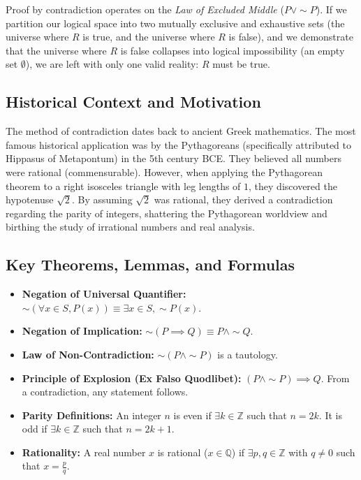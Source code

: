 \documentclass[11pt, letterpaper]{article}
\theoremstyle{remark}
\newcommand{\Z}{\mathbb{Z}}
\newcommand{\Q}{\mathbb{Q}}
\begin{document}
Proof by contradiction operates on the \textit{Law of Excluded Middle} ($P \lor \sim P$). If we partition our logical space into two mutually exclusive and exhaustive sets (the universe where $R$ is true, and the universe where $R$ is false), and we demonstrate that the universe where $R$ is false collapses into logical impossibility (an empty set $\emptyset$), we are left with only one valid reality: $R$ must be true.

\subsection{Historical Context and Motivation}
The method of contradiction dates back to ancient Greek mathematics. The most famous historical application was by the Pythagoreans (specifically attributed to Hippasus of Metapontum) in the 5th century BCE. They believed all numbers were rational (commensurable). However, when applying the Pythagorean theorem to a right isosceles triangle with leg lengths of $1$, they discovered the hypotenuse $\sqrt{2}$. By assuming $\sqrt{2}$ was rational, they derived a contradiction regarding the parity of integers, shattering the Pythagorean worldview and birthing the study of irrational numbers and real analysis.

\subsection{Key Theorems, Lemmas, and Formulas}
\begin{itemize}
    \item \textbf{Negation of Universal Quantifier:} $\sim (\forall x \in S, P(x)) \equiv \exists x \in S, \sim P(x)$.
    \item \textbf{Negation of Implication:} $\sim (P \implies Q) \equiv P \land \sim Q$.
    \item \textbf{Law of Non-Contradiction:} $\sim (P \land \sim P)$ is a tautology.
    \item \textbf{Principle of Explosion (Ex Falso Quodlibet):} $(P \land \sim P) \implies Q$. From a contradiction, any statement follows.
    \item \textbf{Parity Definitions:} An integer $n$ is even if $\exists k \in \Z$ such that $n = 2k$. It is odd if $\exists k \in \Z$ such that $n = 2k + 1$.
    \item \textbf{Rationality:} A real number $x$ is rational ($x \in \Q$) if $\exists p, q \in \Z$ with $q \neq 0$ such that $x = \frac{p}{q}$.
\end{itemize}
\end{document}
